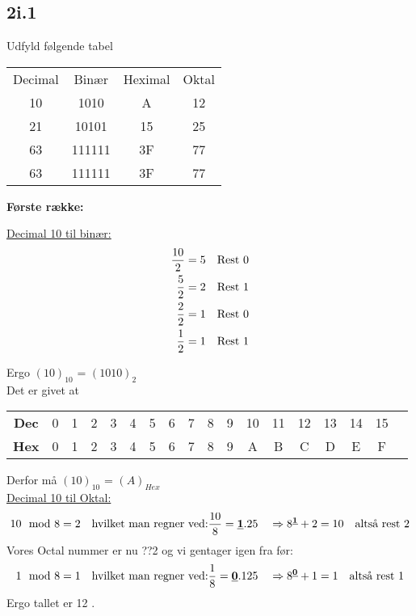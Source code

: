 \subsection{2i.1}

Udfyld følgende tabel

\begin{table}[h]
	\centering
	\begin{tabular}{|c|c|c|c|}
		\hline
		Decimal & Binær & Heximal & Oktal  \\ \cline{1-4}
		10 & 1010 & A & 12 \\ \cline{1-4}
		21 & 10101 & 15 & 25  \\ \cline{1-4}
		63 & 111111 & 3F & 77 \\ \cline{1-4}
		63 & 111111 & 3F & 77 \\ \cline{1-4}
	\end{tabular}
\end{table}

\clearpage

\textbf{Første række:}

\underline{Decimal 10 til binær:}
\begin{align*}
	\frac{10}{2} &= 5 \hphantom{10} \text{Rest 0}\\
	\frac{5}{2} &= 2 \hphantom{10} \text{Rest 1}\\
	\frac{2}{2} &= 1 \hphantom{10} \text{Rest 0}\\
	\frac{1}{2} &= 1 \hphantom{10} \text{Rest 1}\\
\end{align*}

Ergo $(10)_{10}$ = $(1010)_2$\\

Det er givet at 

\begin{table}[h]
	\centering
	\begin{tabular}{|c|c|c|c|c|c|c|c|c|c|c|c|c|c|c|c|c|c|}
		\hline
		\textbf{Dec}&0&1&2&3&4&5&6&7&8&9&10&11&12&13&14&15\\ \cline{1-17}
		\textbf{Hex}&0&1&2&3&4&5&6&7&8&9&A&B&C&D&E&F\\ \cline{1-17}
	\end{tabular}
\end{table}

Derfor må $(10)_{10}$ = $(A)_{Hex}$\\

\underline{Decimal 10 til Oktal:}
$$
10\mod 8 = 2 \hphantom{10} \text{hvilket man regner ved:} \frac{10}{8} = \underline{\textbf{1}}.25 \hphantom{10} \Rightarrow 8^{\underline{\textbf{1}}} + 2 = 10 \hphantom{10} \text{altså rest 2}\\
$$
Vores Octal nummer er nu ??2 og vi gentager igen fra før:
$$
1\mod 8 = 1 \hphantom{10} \text{hvilket man regner ved:} \frac{1}{8} = \underline{\textbf{0}}.125 \hphantom{10} \Rightarrow 8^{\underline{\textbf{0}}} + 1 = 1 \hphantom{10} \text{altså rest 1}\\
$$
Ergo tallet er 12 .\\


